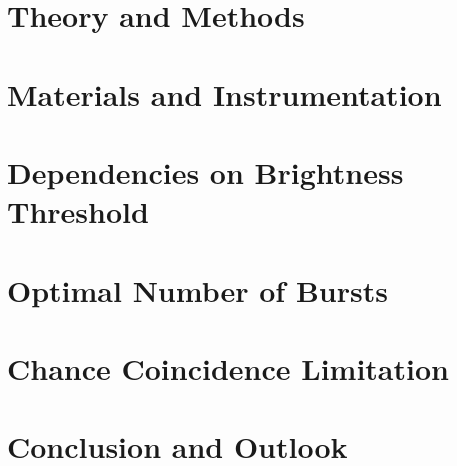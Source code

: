 	\chapter{Theory and Methods} \label{Chapter:TheoryAndMethods}
	
	\newpage
	
	\chapter{Materials and Instrumentation} \label{Chapter:MaterialAndInstrumentation}
	
	\newpage
		
	\chapter{Dependencies on Brightness Threshold} \label{Chapter:DependenciesOnBrightnessThreshold}
	
	\newpage
	
	\chapter{Optimal Number of Bursts} \label{Chapter:OptimalNumberOfBursts}
	
	\newpage
	
	\chapter{Chance Coincidence Limitation} \label{Chapter:ChanceCoincidenceLimitation}
	
	\newpage
	
	\chapter{Conclusion and Outlook} \label{Chapter:ConclusionAndOutlook}
	
	\newpage
	
	\printbibliography
	
	\appendix
	
	\newpage
	
